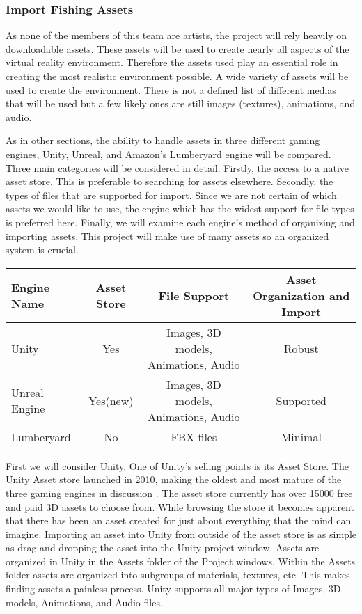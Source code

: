 \documentclass[10pt,journal,compsoc,onecolumn, draftclsnofoot]{IEEEtran}
\begin{document}
\begin{bibunit}
\subsubsection{Import Fishing Assets}
As none of the members of this team are artists, the project will rely heavily on downloadable assets.
These assets will be used to create nearly all aspects of the virtual reality environment.
Therefore the assets used play an essential role in creating the most realistic environment possible.
A wide variety of assets will be used to create the environment.
There is not a defined list of different medias that will be used but a few likely ones are still images (textures), animations, and audio.

As in other sections, the ability to handle assets in three different gaming engines, Unity, Unreal, and Amazon's Lumberyard engine will be compared.
Three main categories will be considered in detail.
Firstly, the access to a native asset store.
This is preferable to searching for assets elsewhere.
Secondly, the types of files that are supported for import.
Since we are not certain of which assets we would like to use, the engine which has the widest support for file types is preferred here.
Finally, we will examine each engine's method of organizing and importing assets.
This project will make use of many assets so an organized system is crucial.

\vspace{2mm}
\begin{table}[h!]
\centering
  \begin{tabular}{ | l || c | c | c | }
  \hline
  Engine Name & Asset Store & File Support & Asset Organization and Import\\
  \hline
  Unity & Yes & Images, 3D models, Animations, Audio & Robust\\ \hline
  Unreal Engine & Yes(new) & Images, 3D models, Animations, Audio & Supported\\ \hline
  Lumberyard & No & FBX files & Minimal\\ \hline
  \end{tabular}
\end{table}
\vspace{2mm}

First we will consider Unity.
One of Unity's selling points is its Asset Store.
The Unity Asset store launched in 2010, making the oldest and most mature of the three gaming engines in discussion \cite{unity_store_age}.
The asset store currently has over 15000 free and paid 3D assets to choose from.
While browsing the store it becomes apparent that there has been an asset created for just about everything that the mind can imagine.
Importing an asset into Unity from outside of the asset store is as simple as drag and dropping the asset into the Unity project window.
Assets are organized in Unity in the Assets folder of the Project windows.
Within the Assets folder assets are organized into subgroups of materials, textures, etc.
This makes finding assets a painless process.
Unity supports all major types of Images, 3D models, Animations, and Audio files.


\end{bibunit}
\end{document}
